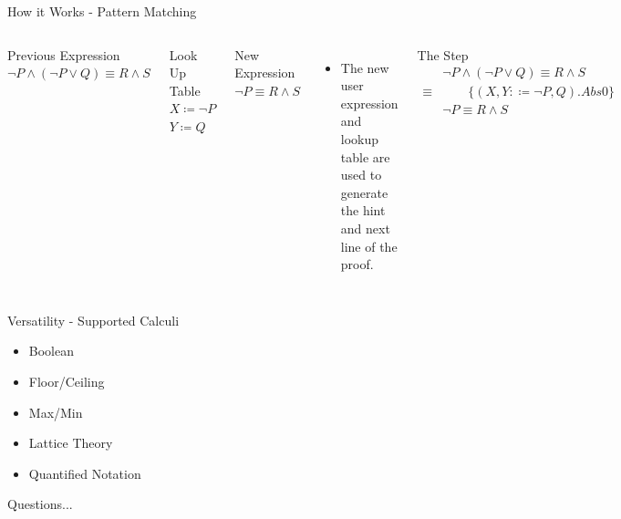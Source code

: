 \documentclass[11pt]{beamer}
\begin{document}


\begin{frame}{How it Works - Pattern Matching}

\begin{columns}[c]

\begin{block}{Previous Expression}
$\neg P \wedge ( \neg P \vee Q ) \equiv R \wedge S $
\end{block}
\begin{block}{Look Up Table}
$X \coloneq \neg P$\\
$Y \coloneq Q$
\end{block}
\begin{block}{New Expression}
$\neg P \equiv R \wedge S $
\end{block}


\begin{itemize}
\item The new user expression and lookup table are used to generate the hint and next line of the proof.
\end{itemize}
\begin{block}{The Step}
\begin{align*}
&\neg P \wedge ( \neg P \vee Q ) \equiv R \wedge S \\
\equiv&\qquad\{(X, Y :\coloneqq \neg P, Q ).Abs0\} \\
&\neg P \equiv R \wedge S 
\end{align*}
\end{block}

\end{columns}

\end{frame}


\begin{frame}{Versatility - Supported Calculi}
\begin{itemize}
\setlength\itemsep{2em}
\item Boolean
\item Floor/Ceiling
\item Max/Min
\item Lattice Theory
\item Quantified Notation
\end{itemize}
\end{frame}

\begin{frame}
\Huge{\centerline{Questions...}}
\end{frame}
\end{document}

